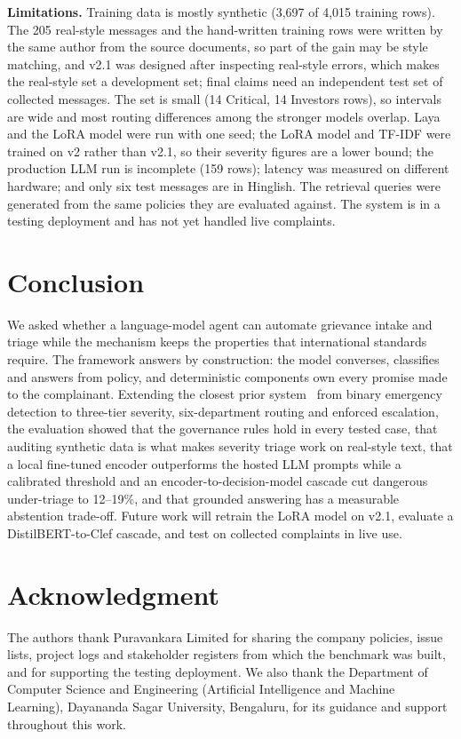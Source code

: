 \documentclass[conference]{IEEEtran}
\begin{document}
\textbf{Limitations.} Training data is mostly synthetic (3,697 of 4,015 training rows). The 205 real-style messages
and the hand-written training rows were written by the same author from the source documents, so part of the gain
may be style matching, and v2.1 was designed after inspecting real-style errors, which makes the real-style set a
development set; final claims need an independent test set of collected messages. The set is small (14 Critical,
14 Investors rows), so intervals are wide and most routing differences among the stronger models overlap. Laya and
the LoRA model were run with one seed; the LoRA model and TF-IDF were trained on v2 rather than v2.1, so their
severity figures are a lower bound; the production LLM run is incomplete (159 rows); latency was measured on
different hardware; and only six test messages are in Hinglish. The retrieval queries were generated from the same
policies they are evaluated against. The system is in a testing deployment and has not yet handled live complaints.

\section{Conclusion}

We asked whether a language-model agent can automate grievance intake and triage while the mechanism keeps the
properties that international standards require. The framework answers by construction: the model converses,
classifies and answers from policy, and deterministic components own every promise made to the complainant.
Extending the closest prior system~\cite{mohanraj2025railmadad} from binary emergency detection to three-tier
severity, six-department routing and enforced escalation, the evaluation showed that the governance rules hold in
every tested case, that auditing synthetic data is what makes severity triage work on real-style text, that a local
fine-tuned encoder outperforms the hosted LLM prompts while a calibrated threshold and an encoder-to-decision-model
cascade cut dangerous under-triage to 12--19\%, and that grounded answering has a measurable abstention trade-off.
Future work will retrain the LoRA model on v2.1, evaluate a DistilBERT-to-Clef cascade, and test on collected
complaints in live use.

\section*{Acknowledgment}
The authors thank Puravankara Limited for sharing the company policies, issue lists, project logs and stakeholder
registers from which the benchmark was built, and for supporting the testing deployment. We also thank the
Department of Computer Science and Engineering (Artificial Intelligence and Machine Learning), Dayananda Sagar
University, Bengaluru, for its guidance and support throughout this work.
\end{document}
